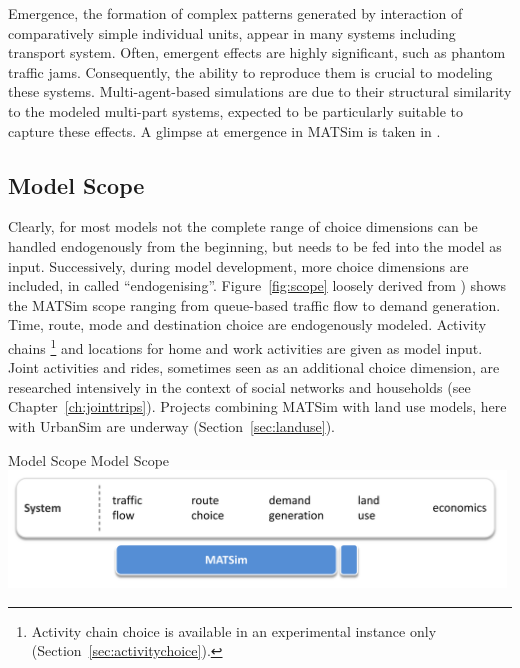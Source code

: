 Emergence, the formation of complex patterns generated by interaction of comparatively simple individual units, appear in many systems including transport system. Often, emergent effects are highly significant, such as phantom traffic jams. Consequently, the ability to reproduce them is crucial to modeling these systems. Multi-agent-based simulations are due to their structural similarity to the modeled multi-part systems, expected to be particularly suitable to capture these effects. A glimpse at emergence in MATSim is taken in \citet[][]{HorniMontini_STRC_2013, HorniMontini_TechRep_IVT_2013}. 

\subsection{Model Scope}
\label{sec:scope}
Clearly, for most models not the complete range of choice dimensions can be handled endogenously from the beginning, but needs to be fed into the model as input. Successively, during model development, more choice dimensions are included, in \citet[][]{NagelAxhausen_TechRep_IVT_2001} called ``endogenising''. Figure~\ref{fig:scope} loosely derived from \citet[][Figure 2]{NagelAxhausen_TechRep_IVT_2001}) shows the MATSim scope ranging from queue-based traffic flow to demand generation. Time, route, mode and destination choice are endogenously modeled. Activity chains \footnote{Activity chain choice is available in an experimental instance only (Section~\ref{sec:activitychoice}).} and locations for home and work activities are given as model input. Joint activities and rides, sometimes seen as an additional choice dimension, are researched intensively in the context of social networks and households (see Chapter~\ref{ch:jointtrips}). Projects combining MATSim with land use models, here with UrbanSim \citep[][]{NicolaiEtAl_TechRep_VSP_2011, NicolaiEtAl_ERSA_2011, SchirmerEtAl_ERSA_2011, Waddell_unpub_UrbanSimTutorial_2010} are underway (Section~\ref{sec:landuse}).

\createfigure%
{Model Scope}%
{Model Scope }%
{\label{fig:scope}}%
{\includegraphics[width=0.99\textwidth, angle=0]{understanding/figures/scope.pdf}}%
{}
%

